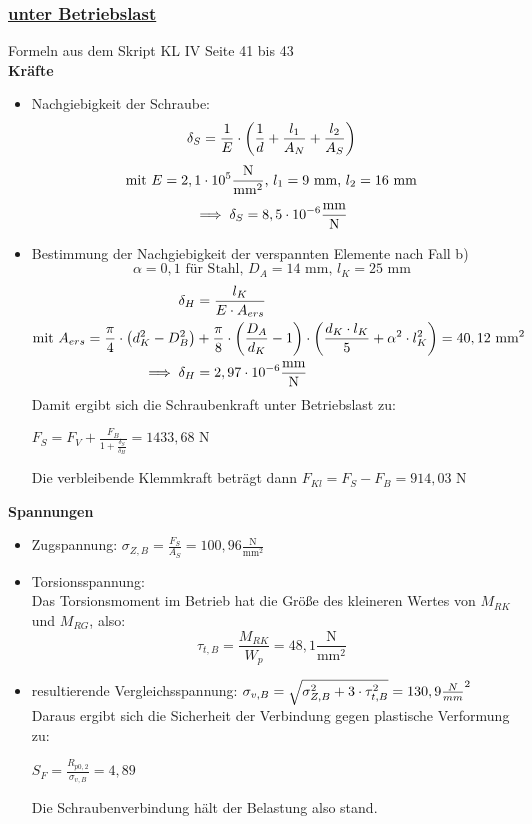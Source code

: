 \subsubsection{\underline{unter Betriebslast}}
Formeln aus dem Skript KL IV  Seite 41 bis 43 \\
\textbf{Kräfte}
\begin{itemize}
	\item Nachgiebigkeit der Schraube:
	\[\delta_S = \frac{1}{E}\cdot \left(\frac{1}{d}+\frac{l_1}{A_N}+\frac{l_2}{A_S}\right)\]
	\[\text{mit } E = 2,1\cdot 10^5 \frac{\text{N}}{\text{mm}^2} \text{, } l_1 = 9 \text{ mm, } l_2 = 16 \text{ mm}\]
	\[\implies \delta_S = 8,5\cdot 10^{-6} \frac{\text{mm}}{\text{N}}\]
	\item Bestimmung der Nachgiebigkeit der verspannten Elemente nach Fall b)
	\[\alpha = 0,1 \text{ für Stahl, } D_A = 14 \text{ mm, } l_K = 25 \text{ mm}\]
	\begin{align*}
	\delta_H &= \frac{l_K}{E\cdot A_{ers}}\\
	\text{mit } A_{ers} = \frac{\pi}{4}\cdot \left(d_K^2 -D_B^2\right) &+ \frac{\pi}{8}\cdot\left(\frac{D_A}{d_K}-1\right)\cdot\left(\frac{d_K\cdot l_K}{5}+ \alpha^2\cdot l_K^2\right) = 40,12 \text{ mm}^2\\
	\implies \delta_H &= 2,97\cdot 10^{-6} \frac{\text{mm}}{\text{N}}
	\end{align*}
	Damit ergibt sich die Schraubenkraft unter Betriebslast zu: \\
	\begin{center}
		$F_S = F_V+ \frac{F_B}{1+\frac{\delta_S}{\delta_H}} = 1433,68 \text{ N}$
	\end{center}
	Die verbleibende Klemmkraft beträgt dann $ F_{Kl} = F_S-F_B = 914,03 \text{ N}$
\end{itemize}
\newpage
\textbf{Spannungen}
\begin{itemize}
	\item Zugspannung:
	$\sigma_{Z,B} = \frac{F_S}{A_S} = 100,96 \frac{\text{N}}{\text{mm}^2}$\\
	\item Torsionsspannung:\\
	\vspace{0.3cm}
	Das Torsionsmoment im Betrieb hat die Größe des kleineren Wertes von $M_{RK}$ und $M_{RG}$, also: 
	\[\tau_{t,B} = \frac{M_{RK}}{W_p} = 48,1 \frac{\text{N}}{\text{mm}^2}\]
	\item resultierende Vergleichsspannung: $\sigma_{v,B} = \sqrt{\sigma_{Z,B}^2+3\cdot \tau_{t,B}^2} = 130,9 \frac{N}{mm}^2$\\
	\vspace{.5cm}
	Daraus ergibt sich die Sicherheit der Verbindung gegen plastische Verformung zu: 
	\begin{center}
		$S_F = \frac{R_{p0,2}}{\sigma_{v,B}} = 4,89$
	\end{center}
	Die Schraubenverbindung hält der Belastung also stand.
\end{itemize}

